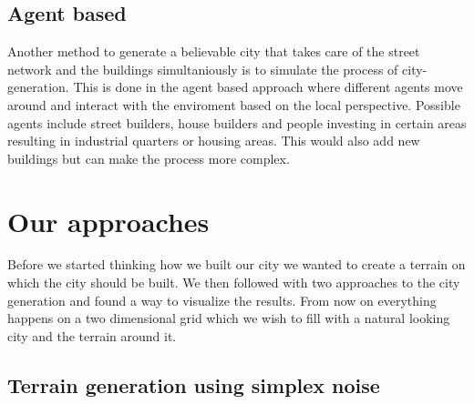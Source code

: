 \documentclass{scrartcl}
\begin{document}
\subsection{Agent based}
Another method to generate a believable city that takes care of the street network
and the buildings simultaniously is to simulate the process of
city-generation. This is done in the agent based approach where different agents
move around and interact with the enviroment based on the local perspective.
Possible agents include street builders, house builders and people investing in certain
areas resulting in industrial quarters or housing areas. This would also add new
buildings but can make the process more complex.



\section{Our approaches}
Before we started thinking how we built our city we wanted to create a terrain
on which the city should be built. We then followed with two approaches to the
city generation and found a way to visualize the results.
From now on everything happens on a two dimensional grid which we wish to fill
with a natural looking city and the terrain around it.


\subsection{Terrain generation using simplex noise}
\end{document}

